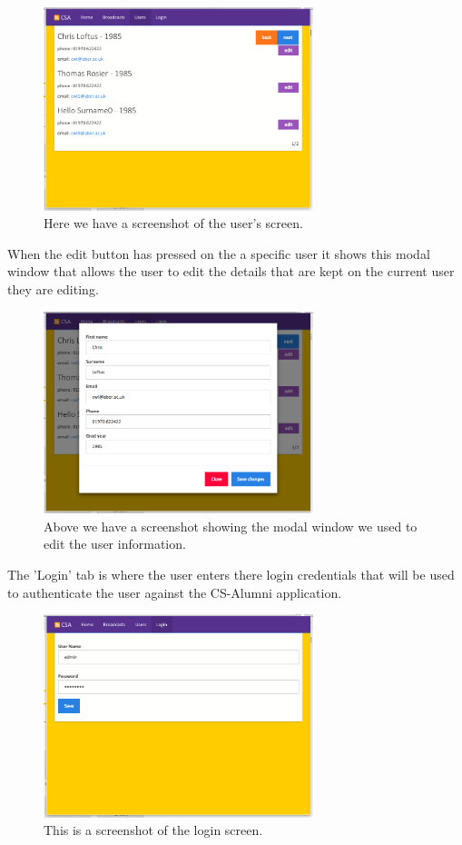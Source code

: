\documentclass{article}
\begin{document}
\begin{figure}[H]
\centering
\includegraphics[width=0.7\textwidth]{userpage}
\caption{Here we have a screenshot of the user's screen.}
\end{figure}

When the edit button has pressed on the a specific user it shows this modal window that allows the user to edit the details that are kept on the current user they are editing.

\begin{figure}[H]
\centering
\includegraphics[width=0.7\textwidth]{modalpage}
\caption{Above we have a screenshot showing the modal window we used to edit the user information.}
\end{figure}

\newpage
The 'Login' tab is where the user enters there login credentials that will be used to authenticate the user against the CS-Alumni application.

\begin{figure}[H]
\centering
\includegraphics[width=0.7\textwidth]{loginpage}
\caption{This is a screenshot of the login screen.}
\end{figure}
\end{document}
